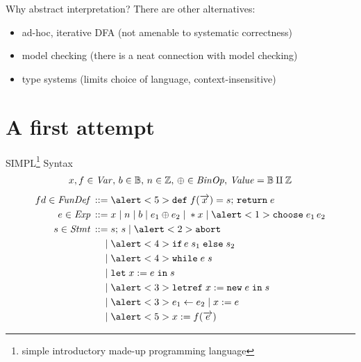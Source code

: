 \documentclass[aspectratio=169,14pt]{beamer}
\begin{document}


\begin{frame}{Why abstract interpretation?}
There are other alternatives:
\begin{itemize}[<+->]
\item ad-hoc, iterative DFA (not amenable to systematic correctness)
\item model checking (there is a neat connection with model checking)
\item type systems (limits choice of language, context-insensitive)
\end{itemize}
\end{frame}

\section{A first attempt}
\begin{frame}{SIMPL\footnote{simple introductory made-up programming language} Syntax}
  \vspace{-2em}
  \small
  \begin{gather*}
    x,f \in \mathit{Var},\, b \in \mathbb{B},\, n \in \mathbb{Z},\, \oplus \in \mathit{BinOp},\,\mathit{Value} = \mathbb{B} \amalg \mathbb{Z}
  \end{gather*}\vspace{-2em}
  \begin{align*}
    fd \in \ns{FunDef} \eDEF & \alert<5>{\kw{def}\; f(\vo{x}) = s;\,\kw{return}\; e} \\
    e \in \Exp \eDEF & x \eOR n \eOR b \eOR e_1 \oplus e_2 \eOR *x \eOR \alert<1>{\kw{choose}\;e_1\,e_2} \\
    s \in \Stmt \eDEF & s;\,s \eOR \alert<2>{\kw{abort}} \\
    \eOR & \alert<4>{\kw{if}\, e\; s_1 \; \kw{else} \; s_2} \\
    \eOR & \alert<4>{\kw{while}\; e\; s} \\
    \eOR & \kw{let}\; x := e \;\kw{in}\;s \\
    \eOR & \alert<3>{\kw{letref}\; x := \kw{new}\;e \;\kw{in}\;s} \\
    \eOR & \alert<3>{e_1 \update e_2} \eOR x := e \\
    \eOR & \alert<5>{x := f(\vo{e})}
  \end{align*}
\end{frame}
\end{document}
